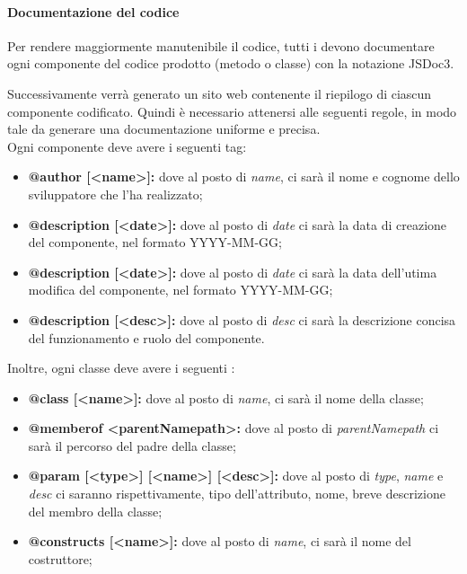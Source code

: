           		\paragraph{Documentazione del codice}
           		Per rendere maggiormente manutenibile il codice, tutti i \programmatori{} devono documentare ogni componente del codice prodotto (metodo o classe) con la notazione JSDoc3. 
           		
           		Successivamente verrà generato un sito web contenente il riepilogo di ciascun componente codificato. Quindi è necessario attenersi alle seguenti regole, in modo tale da generare una documentazione uniforme e precisa. \\
           		Ogni componente deve avere i seguenti tag:
           		\begin{itemize}
           			\item \textbf{@author [<name>]:} dove al posto di \textit{name}, ci sarà il nome e cognome dello sviluppatore che l'ha realizzato;
           			\item \textbf{@description [<date>]:} dove al posto di \textit{date} ci sarà la data di creazione del componente, nel formato YYYY-MM-GG;
           			\item \textbf{@description [<date>]:} dove al posto di \textit{date} ci sarà la data dell'utima modifica del componente, nel formato YYYY-MM-GG;
           			\item \textbf{@description [<desc>]:} dove al posto di \textit{desc} ci sarà la descrizione concisa del funzionamento e ruolo del componente.
           		\end{itemize} 
           		Inoltre, ogni classe deve avere i seguenti :
           		\begin{itemize}
           			\item \textbf{@class [<name>]:} dove al posto di \textit{name}, ci sarà il nome della classe;
           			\item \textbf{@memberof <parentNamepath>:} dove al posto di \textit{parentNamepath} ci sarà il percorso del padre della classe;
           			\item \textbf{@param [<{type}>] [<name>] [<desc>]:} dove al posto di \textit{type}, \textit{name} e \textit{desc} ci saranno rispettivamente, tipo dell'attributo, nome, breve descrizione del membro della classe;
           			\item \textbf{@constructs [<name>]:} dove al posto di \textit{name}, ci sarà il nome del costruttore;
           		\end{itemize}
